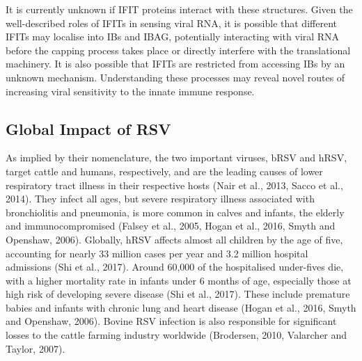 It is currently unknown if IFIT proteins interact with these structures. Given the well-described roles of IFITs in sensing viral RNA, it is possible that different IFITs may localise into IBs and IBAG, potentially interacting with viral RNA before the capping process takes place or directly interfere with the translational machinery. It is also possible that IFITs are restricted from accessing IBs by an unknown mechanism. Understanding these processes may reveal novel routes of increasing viral sensitivity to the innate immune response.

\subsection{Global Impact of RSV} \label{subsec:Global Impact of RSV}

As implied by their nomenclature, the two important viruses, bRSV and hRSV, target cattle and humans, respectively, and are the leading causes of lower respiratory tract illness in their respective hosts (Nair et al., 2013, Sacco et al., 2014). They infect all ages, but severe respiratory illness associated with bronchiolitis and pneumonia, is more common in calves and infants, the elderly and immunocompromised (Falsey et al., 2005, Hogan et al., 2016, Smyth and Openshaw, 2006). Globally, hRSV affects almost all children by the age of five, accounting for nearly 33 million cases per year and 3.2 million hospital admissions (Shi et al., 2017). Around 60,000 of the hospitalised under-fives die, with a higher mortality rate in infants under 6 months of age, especially those at high risk of developing severe disease (Shi et al., 2017). These include premature babies and infants with chronic lung and heart disease (Hogan et al., 2016, Smyth and Openshaw, 2006). Bovine RSV infection is also responsible for significant losses to the cattle farming industry worldwide (Brodersen, 2010, Valarcher and Taylor, 2007).

